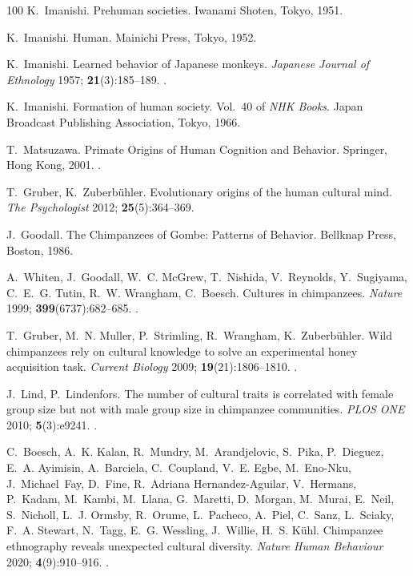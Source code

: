 \documentclass{ws-ijmpb}
\begin{document}
\begin{thebibliography}{100}
K.~Imanishi. Prehuman societies. Iwanami Shoten, Tokyo, 1951.

K.~Imanishi. Human. Mainichi Press, Tokyo, 1952.

K.~Imanishi. Learned behavior of {J}apanese monkeys. \emph{Japanese Journal of
  Ethnology} 1957; \textbf{21}(3):185--189.
\newblock \href {http://doi.org/10.14890/minkennewseries.21.3_185}
  {}.

K.~Imanishi. Formation of human society. Vol.~40 of \emph{NHK Books}. Japan
  Broadcast Publishing Association, Tokyo, 1966.

T.~Matsuzawa. Primate Origins of Human Cognition and Behavior. Springer, Hong
  Kong, 2001.
\newblock \href {http://doi.org/10.1007/978-4-431-09423-4}
  {}.

T.~Gruber, K.~Zuberb\"{u}hler. Evolutionary origins of the human cultural mind.
  \emph{The Psychologist} 2012; \textbf{25}(5):364--369.

J.~Goodall. The Chimpanzees of Gombe: Patterns of Behavior. Bellknap Press,
  Boston, 1986.

A.~Whiten, J.~Goodall, W.~C. McGrew, T.~Nishida, V.~Reynolds, Y.~Sugiyama,
  C.~E.~G. Tutin, R.~W. Wrangham, C.~Boesch. Cultures in chimpanzees.
  \emph{Nature} 1999; \textbf{399}(6737):682--685.
\newblock \href {http://doi.org/10.1038/21415} {}.

T.~Gruber, M.~N. Muller, P.~Strimling, R.~Wrangham, K.~Zuberb\"{u}hler. Wild
  chimpanzees rely on cultural knowledge to solve an experimental honey
  acquisition task. \emph{Current Biology} 2009; \textbf{19}(21):1806--1810.
\newblock \href {http://doi.org/10.1016/j.cub.2009.08.060}
  {}.

J.~Lind, P.~Lindenfors. The number of cultural traits is correlated with female
  group size but not with male group size in chimpanzee communities. \emph{PLOS
  ONE} 2010; \textbf{5}(3):e9241.
\newblock \href {http://doi.org/10.1371/journal.pone.0009241}
  {}.

C.~Boesch, A.~K. Kalan, R.~Mundry, M.~Arandjelovic, S.~Pika, P.~Dieguez, E.~A.
  Ayimisin, A.~Barciela, C.~Coupland, V.~E. Egbe, M.~Eno-Nku, J.~Michael~Fay,
  D.~Fine, R.~Adriana Hernandez-Aguilar, V.~Hermans, P.~Kadam, M.~Kambi,
  M.~Llana, G.~Maretti, D.~Morgan, M.~Murai, E.~Neil, S.~Nicholl, L.~J. Ormsby,
  R.~Orume, L.~Pacheco, A.~Piel, C.~Sanz, L.~Sciaky, F.~A. Stewart, N.~Tagg,
  E.~G. Wessling, J.~Willie, H.~S. K\"{u}hl. Chimpanzee ethnography reveals
  unexpected cultural diversity. \emph{Nature Human Behaviour} 2020;
  \textbf{4}(9):910--916.
\newblock \href {http://doi.org/10.1038/s41562-020-0890-1}
  {}.


\end{thebibliography}
\end{document}
